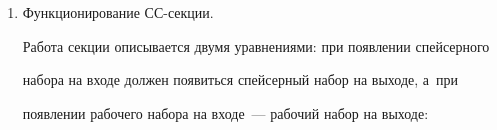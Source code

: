 \begin{enumerate}[1.]
   Выходная рабочая функция:


   \begin{multline}


R = \left(U_1\oplus V_1\right)\cdots \left(U_M\oplus V_M\right) \left(U_1=P_1\right) 


\left(V_1=G_1\right)\cdots \\


\cdots\left(U_M=P_M\right)\left(V_M=G_M\right) {^\wedge I_1} \ldots 


{^\wedge I_K}\,.


\label{e5-pl}


\end{multline}





   Последняя функция получена из условий, что в~рабочей фазе сопряженные 


выходы секции должны быть взаимно обратны, а~также быть равны  


ПФС-функ\-ци\-ям. Индикаторы должны принимать обратные выходному 


спейсеру значения.


   


   Сопряженные выходы $U_m$ и~$V_m$ СС-сек\-ции не должны 


одновременно принимать значение, инверсное выходному спейсеру:


   \begin{equation}


   {^\wedge U_1}\, {^\wedge V_1} \vee {^\wedge U_2}\, {^\wedge V_2} \vee \cdots \vee 


   {^\wedge U_M}\, {^\wedge V_M} = 0\,.


   \label{e6-pl}


   \end{equation}


   \item Функционирование СС-секции.


  


   Работа секции описывается двумя уравнениями: при появлении спейсерного 


набора на входе должен появиться спейсерный набор на выходе, а~при 


появлении рабочего набора на входе~--- рабочий набор на выходе:


   \begin{equation}



\end{equation}
\end{enumerate}
